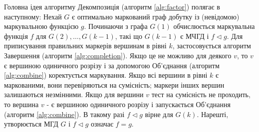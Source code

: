 Головна ідея алгоритму Декомпозиція (алгоритм \ref{alg:factor}) полягає в наступному: Нехай $G$ є оптимально маркований граф добутку із (невідомою) маркувальною функцією $g$.
Починаючи з графа $G(1)$ обчислюється маркувальна функція $f$ для $G(2),\dots,G(k-1)$, такі що $G(k-1)$ є МЧГД і $f \triangleleft g$.
Для приписування правильних маркерів вершинам в рівні $k$, застосовується алгоритм Завершення (алгоритм \ref{alg:completion}).
Якщо це не можливо для деякого $v$, то $v$ є вершиною одиничного розрізу і за допомогою Об'єднання (алгоритм \ref{alg:combine}) коректується маркування.
Якщо всі вершини в рівні $k$ є маркованими, вони перевіряються на сумісність; маркери інших вершин залишаються незмінними.
Якщо для вершини $v$ тест на сумісність не проходить, то вершина $v$ - є вершиною одиничного розрізу і запускається Об'єднання (алгоритм \ref{alg:combine}).
В такому разі $f \triangleleft g$ вірне для $G(k)$.
Нарешті, утворюється МГД $G$ і $f \triangleleft g$ означає $f=g$.








